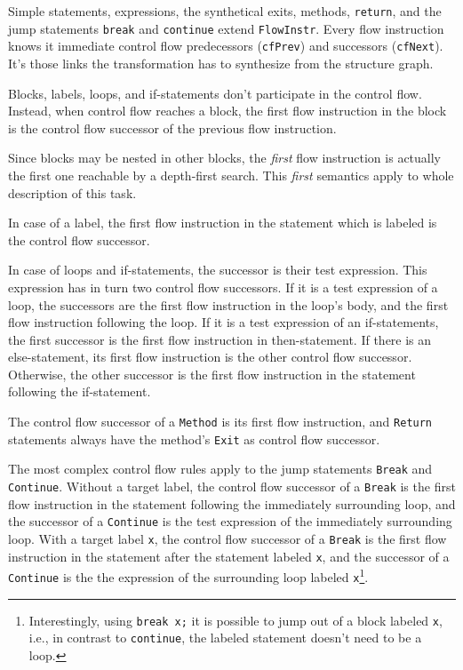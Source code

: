 \documentclass[11pt]{article}
\begin{document}
Simple statements, expressions, the synthetical exits, methods, \verb|return|,
and the jump statements \verb|break| and \verb|continue| extend
\verb|FlowInstr|.  Every flow instruction knows it immediate control flow
predecessors (\verb|cfPrev|) and successors (\verb|cfNext|).  It's those links
the transformation has to synthesize from the structure graph.

Blocks, labels, loops, and if-statements don't participate in the control flow.
Instead, when control flow reaches a block, the first flow instruction in the
block is the control flow successor of the previous flow instruction.

Since blocks may be nested in other blocks, the \emph{first} flow instruction
is actually the first one reachable by a depth-first search.  This \emph{first}
semantics apply to whole description of this task.

In case of a label, the first flow instruction in the statement which is
labeled is the control flow successor.

In case of loops and if-statements, the successor is their test expression.
This expression has in turn two control flow successors.  If it is a test
expression of a loop, the successors are the first flow instruction in the
loop's body, and the first flow instruction following the loop.  If it is a
test expression of an if-statements, the first successor is the first flow
instruction in then-statement.  If there is an else-statement, its first flow
instruction is the other control flow successor.  Otherwise, the other
successor is the first flow instruction in the statement following the
if-statement.

The control flow successor of a \verb|Method| is its first flow instruction,
and \verb|Return| statements always have the method's \verb|Exit| as control
flow successor.

The most complex control flow rules apply to the jump statements \verb|Break|
and \verb|Continue|.  Without a target label, the control flow successor of a
\verb|Break| is the first flow instruction in the statement following the
immediately surrounding loop, and the successor of a \verb|Continue| is the
test expression of the immediately surrounding loop.  With a target label
\verb|x|, the control flow successor of a \verb|Break| is the first flow
instruction in the statement after the statement labeled \verb|x|, and the
successor of a \verb|Continue| is the the expression of the surrounding loop
labeled \verb|x|\footnote{Interestingly, using \texttt{break x;} it is possible
  to jump out of a block labeled \texttt{x}, i.e., in contrast to
  \texttt{continue}, the labeled statement doesn't need to be a loop.}.
\end{document}
